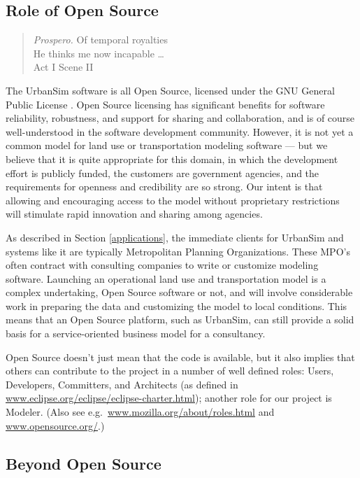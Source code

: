 \documentclass[times, 10pt,twocolumn]{article}
\begin{document}
\subsection{Role of Open Source}

\begin{quote}
\emph{Prospero.}
Of temporal royalties \\
He thinks me now incapable \ldots \\
\hspace*{1cm} Act I Scene II
\end{quote}

The UrbanSim software is all Open Source, licensed under the GNU General
Public License \cite{gpl-web}.  Open Source licensing has significant
benefits for software reliability, robustness, and support for sharing and
collaboration, and is of course well-understood in the software development
community.  However, it is not yet a common model for land use or
transportation modeling software --- but we believe that it is quite
appropriate for this domain, in which the development effort is publicly
funded, the customers are government agencies, and the requirements for
openness and credibility are so strong.  Our intent is that allowing and
encouraging access to the model without proprietary restrictions will
stimulate rapid innovation and sharing among agencies.

As described in Section \ref{applications}, the immediate clients for
UrbanSim and systems like it are typically Metropolitan Planning
Organizations.  These MPO's often contract with consulting companies to
write or customize modeling software.  Launching an operational land use
and transportation model is a complex undertaking, Open Source software or
not, and will involve considerable work in preparing the data and
customizing the model to local conditions.  This means that an Open Source
platform, such as UrbanSim, can still provide a solid basis for a
service-oriented business model for a consultancy.

Open Source doesn't just mean that the code is available, but it also
implies that others can contribute to the project in a number of well
defined roles: Users, Developers, Committers, and Architects (as defined in
\url{www.eclipse.org/eclipse/eclipse-charter.html}); another role for our
project is Modeler.  (Also see e.g.\
\url{www.mozilla.org/about/roles.html} and \url{www.opensource.org/}.)

\subsection{Beyond Open Source}
\end{document}
